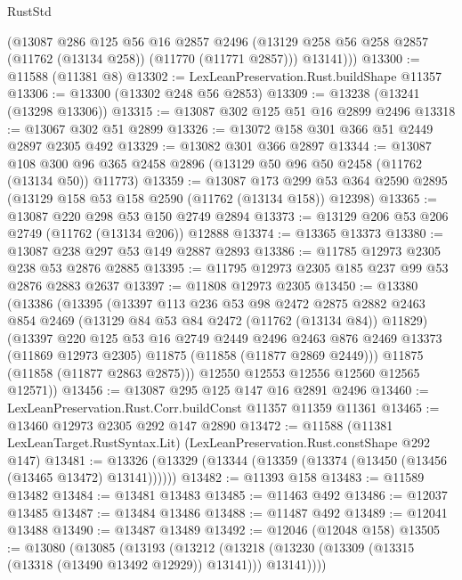 \begin{lexlean}{RustStd}
\begin{coremodule}
        (@13087
          @286
          @125
          @56
          @16
          @2857
          @2496
          (@13129 @258 @56 @258 @2857 (@11762 (@13134 @258)) (@11770 (@11771 @2857)))
          @13141)))
@13300 := @11588 (@11381 @8)
@13302 := LexLeanPreservation.Rust.buildShape @11357
@13306 := @13300 (@13302 @248 @56 @2853)
@13309 := @13238 (@13241 (@13298 @13306))
@13315 := @13087 @302 @125 @51 @16 @2899 @2496
@13318 := @13067 @302 @51 @2899
@13326 := @13072 @158 @301 @366 @51 @2449 @2897 @2305 @492
@13329 := @13082 @301 @366 @2897
@13344 := @13087
    @108
    @300
    @96
    @365
    @2458
    @2896
    (@13129 @50 @96 @50 @2458 (@11762 (@13134 @50)) @11773)
@13359 := @13087
    @173
    @299
    @53
    @364
    @2590
    @2895
    (@13129 @158 @53 @158 @2590 (@11762 (@13134 @158)) @12398)
@13365 := @13087 @220 @298 @53 @150 @2749 @2894
@13373 := @13129 @206 @53 @206 @2749 (@11762 (@13134 @206)) @12888
@13374 := @13365 @13373
@13380 := @13087 @238 @297 @53 @149 @2887 @2893
@13386 := @11785 @12973 @2305 @238 @53 @2876 @2885
@13395 := @11795 @12973 @2305 @185 @237 @99 @53 @2876 @2883 @2637
@13397 := @11808 @12973 @2305
@13450 := @13380
    (@13386
      (@13395
        (@13397
          @113
          @236
          @53
          @98
          @2472
          @2875
          @2882
          @2463
          @854
          @2469
          (@13129 @84 @53 @84 @2472 (@11762 (@13134 @84)) @11829)
          (@13397
            @220
            @125
            @53
            @16
            @2749
            @2449
            @2496
            @2463
            @876
            @2469
            @13373
            (@11869 @12973 @2305)
            @11875
            (@11858 (@11877 @2869 @2449)))
          @11875
          (@11858 (@11877 @2863 @2875)))
        @12550
        @12553
        @12556
        @12560
        @12565
        @12571))
@13456 := @13087 @295 @125 @147 @16 @2891 @2496
@13460 := LexLeanPreservation.Rust.Corr.buildConst @11357 @11359 @11361
@13465 := @13460 @12973 @2305 @292 @147 @2890
@13472 := @11588
    (@11381 LexLeanTarget.RustSyntax.Lit)
    (LexLeanPreservation.Rust.constShape @292 @147)
@13481 := @13326 (@13329 (@13344 (@13359 (@13374 (@13450 (@13456 (@13465 @13472) @13141))))))
@13482 := @11393 @158
@13483 := @11589 @13482
@13484 := @13481 @13483
@13485 := @11463 @492
@13486 := @12037 @13485
@13487 := @13484 @13486
@13488 := @11487 @492
@13489 := @12041 @13488
@13490 := @13487 @13489
@13492 := @12046 (@12048 @158)
@13505 := @13080
    (@13085
      (@13193
        (@13212 (@13218 (@13230 (@13309 (@13315 (@13318 (@13490 @13492 @12929)) @13141))) @13141))))

\end{coremodule}
\end{lexlean}
